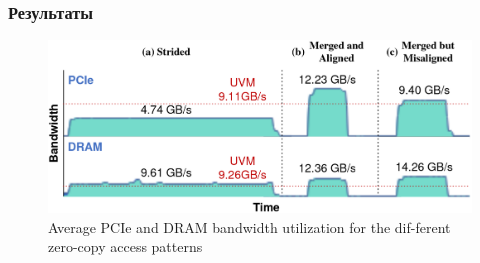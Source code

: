\documentclass[xcolor=table,english]{beamer}
\begin{document}
\begin{frame}[fragile] \frametitle{Результаты}
    \begin{center}
    \begin{minipage}[m]{0.85\linewidth}
        \begin{figure}
            \centering
            \includegraphics[width=\textwidth]{figures/access_patterns_utilization.png}
            \caption{Average PCIe and DRAM bandwidth utilization for the dif-ferent zero-copy access patterns}
            \label{fig:access_patterns_utilization}
        \end{figure}
    \end{minipage}\hfill
    \end{center} 
\end{frame}
\end{document}
